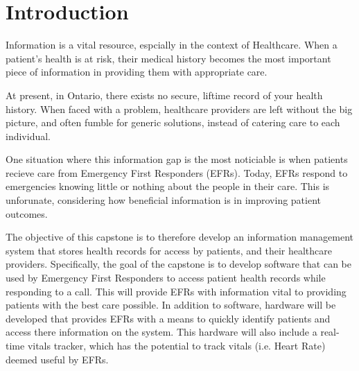 
\section{Introduction}

Information is a vital resource, espcially in the context of Healthcare. When a patient's health is at risk, their medical history becomes the most important piece of information in providing them with appropriate care.

At present, in Ontario, there exists no secure, liftime record of your health history. When faced with a problem, healthcare providers are left without the big picture, and often fumble for generic solutions, instead of catering care to each individual.

One situation where this information gap is the most noticiable is when patients recieve care from Emergency First Responders (EFRs). Today, EFRs respond to emergencies knowing little or nothing about the people in their care. This is unforunate, considering how beneficial information is in improving patient outcomes. \iffalse For example, nursing homes often carry documents that contain health information on their residents. This information, including medications, allergies and diagonsed disorders gives EFRs an important base-knowledge for how assessing a patient. \fi

The objective of this capstone is to therefore develop an information management system that stores health records for access by patients, and their healthcare providers. Specifically, the goal of the capstone is to develop software that can be used by Emergency First Responders to access patient health records while responding to a call. This will provide EFRs with information vital to providing patients with the best care possible. In addition to software, hardware will be developed that provides EFRs with a means to quickly identify patients and access there information on the system. This hardware will also include a real-time vitals tracker, which has the potential to track vitals (i.e. Heart Rate) deemed useful by EFRs.
